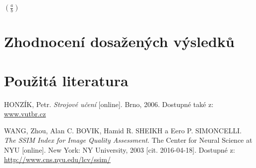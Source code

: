 \documentclass[a4paper,11pt]{scrartcl}
\begin{document}
$ \left(  \frac{a}{b} \right) $

\section{Zhodnocení dosažených výsledků}

\section{Použitá literatura}

\begin{thebibliography}{9}
 
HONZÍK, Petr. \emph{Strojové učení} [online]. Brno, 2006. Dostupné také z: \url{www.vutbr.cz}

WANG, Zhou, Alan C. BOVIK, Hamid R. SHEIKH a Eero P. SIMONCELLI. \emph{The SSIM Index for Image Quality Assessment}. The Center for Neural Science at NYU [online]. New York: NY University, 2003 [cit. 2016-04-18]. Dostupné z: \url{http://www.cns.nyu.edu/lcv/ssim/}

\end{thebibliography}
\end{document}
